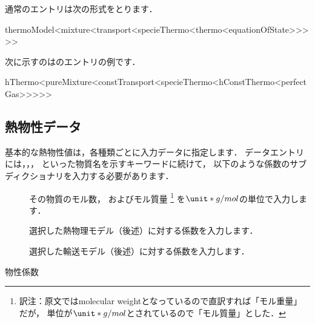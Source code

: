 通常のエントリは次の形式をとります．
\begin{OFverbatim}[file]
thermoModel<mixture<transport<specieThermo<thermo<equationOfState>>>>>
\end{OFverbatim}
次に示すのはのエントリの例です．
\begin{OFverbatim}[file]
hThermo<pureMixture<constTransport<specieThermo<hConstThermo<perfectGas>>>>>
\end{OFverbatim}


\subsection{熱物性データ}
\label{ssec:7.1.1}
基本的な熱物性値は，各種類ごとに入力データに指定します．
データエントリには，，，
といった物質名を示すキーワードに続けて，
以下のような係数のサブディクショナリを入力する必要があります．
\begin{description}
 \item[] その物質のモル数，
            およびモル質量%
\footnote{訳注：原文ではmolecular weightとなっているので直訳すれば「モル重量」だが，
            単位が$\unit*{g/mol}$とされているので「モル質量」とした．}%
            を$\unit*{g/mol}$の単位で入力します．
 \item[] 選択した熱物理モデル（後述）に対する係数を入力します．
 \item[] 選択した輸送モデル（後述）に対する係数を入力します．
\end{description}


\begin{table}[ht]
 
 \caption{物性係数}
 \label{tbl:7.2}
\end{table}


